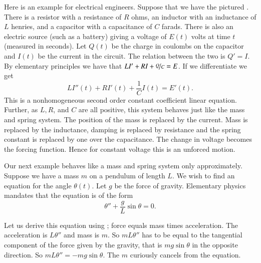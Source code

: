 \documentclass[12pt]{book}
\begin{document}
\begin{diffyfloatingfigure}{1.35in}{1.65in}
\noindent
{}
\end{diffyfloatingfigure}
Here is an example for electrical engineers.  Suppose that we have the
pictured .
There is a resistor with a resistance of $R$ ohms, an
inductor with an inductance of $L$ henries,
and a capacitor with a capacitance of $C$ farads.  There is also
an electric source (such as a battery) giving a voltage of $E(t)$ volts
at time $t$ (measured in seconds).
Let $Q(t)$ be the charge in coulombs on the capacitor
and $I(t)$ be the current in the circuit.  The relation between the two is
$Q' = I$.  By elementary principles we have that
$L I' + RI + \nicefrac{Q}{C} = E$.   If we differentiate we get
\begin{equation*}
L I''(t) + R I'(t) + \frac{1}{C} I(t) = E'(t) .
\end{equation*}
This is a nonhomogeneous second order constant coefficient linear equation.
Further, as $L, R$, and $C$ are all positive, this system behaves just like the
mass and spring system.  The position of the mass is replaced by the current.
Mass is replaced by the inductance, damping is replaced by resistance and
the spring constant is replaced by one over the capacitance.  The change in
voltage becomes the forcing function.  Hence for constant voltage this is an
unforced motion.

\medskip

\begin{diffyfloatingfigure}{1.45in}{1.75in}
\diffypdfversion{\vspace*{-0.2cm}}
\noindent
{}
\end{diffyfloatingfigure}
Our next example behaves like a mass and spring system only
approximately. Suppose we have a
mass $m$ on a pendulum of length $L$.  We wish to find an equation for
the angle $\theta(t)$.  Let $g$ be the force of gravity.
Elementary physics mandates that the equation is
of the form
\begin{equation*}
\theta'' + \frac{g}{L} \sin \theta = 0 .
\end{equation*}

Let us derive this equation using ;
force equals mass times acceleration.  The acceleration is
$L \theta''$ and mass is $m$.  So $mL\theta''$ has to be equal
to the tangential component of the force given by the gravity, that is
$m g \sin \theta$ in the opposite direction.
So $mL\theta'' = -mg \sin \theta$.
The $m$ curiously cancels from the equation.
\end{document}
